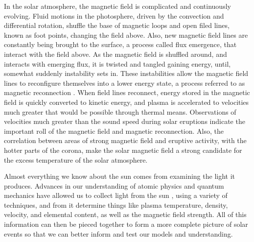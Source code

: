 In the solar atmosphere, the magnetic field is complicated and continuously evolving.
Fluid motions in the photosphere, driven by the convection and differential rotation, shuffle the base of magnetic loops and open filed lines, known as foot points, changing the field above.
Also, new magnetic field lines are constantly being brought to the surface, a process called flux emergence, that interact with the field above.
As the magnetic field is shuffled around, and interacts with emerging flux, it is twisted and tangled gaining energy, until, somewhat suddenly instability sets in.
These instabilities allow the magnetic field lines to reconfigure themselves into a lower energy state, a process referred to as magnetic reconnection \citep{Parker1957,Petschek1964}.
When field lines reconnect, energy stored in the magnetic field is quickly converted to kinetic energy, and plasma is accelerated to velocities much greater that would be possible through thermal means.
Observations of velocities much greater than the sound speed during solar eruptions indicate the important roll of the magnetic field and magnetic reconnection.
Also, the correlation between areas of strong magnetic field and eruptive activity, with the hotter parts of the corona, make the solar magnetic field a strong candidate for the excess temperature of the solar atmosphere.
 


Almost everything we know about the sun comes from examining the light it produces. 
Advances in our understanding of atomic physics and quantum mechanics have allowed us to collect light from the sun , using a variety of techniques, and from it determine things like plasma temperature, density, velocity, and elemental content, as well as the magnetic field strength.
All of this information can then be pieced together to form a more complete picture of solar events so that we can better inform and test our models and understanding.


